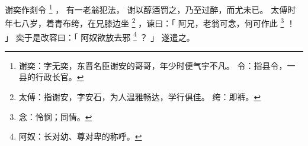 
\switchcolumn*[\section{}]

谢奕作剡令%
\footnote{%
    谢奕：字无奕，东晋名臣谢安的哥哥，年少时便气宇不凡。
    令：指县令，一县的行政长官。
}%
，
有一老翁犯法，
谢以醇酒罚之，乃至过醉，而尤未已。
太傅时年七八岁，着青布绔，在兄膝边坐%
\footnote{%
    太傅：指谢安，字安石，为人温雅畅达，学行俱佳。
    绔：即裤。
}%
，谏曰：「
    阿兄，老翁可念，何可作此%
    \footnote{%
        念：怜悯；同情。
    }%
    ！
」
奕于是改容曰：「
    阿奴欲放去邪%
    \footnote{%
        阿奴：长对幼、尊对卑的称呼。
    }%
    ？
」
遂遣之。

\switchcolumn


